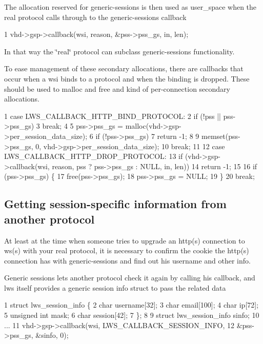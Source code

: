 The allocation reserved for generic-\/sessions is then used as user\+\_\+space when the real protocol calls through to the generic-\/sessions callback


\begin{DoxyCode}
1 vhd->gsp->callback(wsi, reason, &pss->pss\_gs, in, len);
\end{DoxyCode}


In that way the \char`\"{}real\char`\"{} protocol can subclass generic-\/sessions functionality.

To ease management of these secondary allocations, there are callbacks that occur when a wsi binds to a protocol and when the binding is dropped. These should be used to malloc and free and kind of per-\/connection secondary allocations.


\begin{DoxyCode}
1 case LWS\_CALLBACK\_HTTP\_BIND\_PROTOCOL:
2         if (!pss || pss->pss\_gs)
3                 break;
4 
5         pss->pss\_gs = malloc(vhd->gsp->per\_session\_data\_size);
6         if (!pss->pss\_gs)
7                 return -1;
8 
9         memset(pss->pss\_gs, 0, vhd->gsp->per\_session\_data\_size);
10         break;
11 
12 case LWS\_CALLBACK\_HTTP\_DROP\_PROTOCOL:
13         if (vhd->gsp->callback(wsi, reason, pss ? pss->pss\_gs : NULL, in, len))
14                 return -1;
15 
16         if (pss->pss\_gs) \{
17                 free(pss->pss\_gs);
18                 pss->pss\_gs = NULL;
19         \}
20         break;
\end{DoxyCode}


\subsection*{Getting session-\/specific information from another protocol }

At least at the time when someone tries to upgrade an http(s) connection to ws(s) with your real protocol, it is necessary to confirm the cookie the http(s) connection has with generic-\/sessions and find out his username and other info.

Generic sessions lets another protocol check it again by calling his callback, and lws itself provides a generic session info struct to pass the related data


\begin{DoxyCode}
1 struct lws\_session\_info \{
2         char username[32];
3         char email[100];
4         char ip[72];
5         unsigned int mask;
6         char session[42];
7 \};
8 
9 struct lws\_session\_info sinfo;
10 ...
11 vhd->gsp->callback(wsi, LWS\_CALLBACK\_SESSION\_INFO,
12                            &pss->pss\_gs, &sinfo, 0);
\end{DoxyCode}


